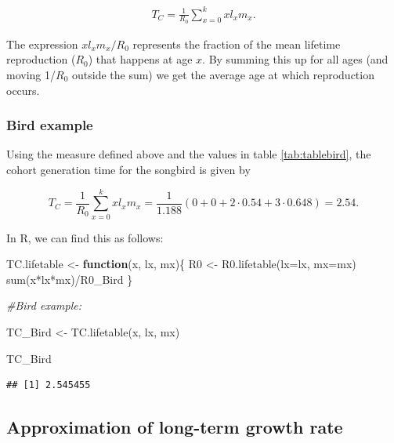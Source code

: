 \documentclass[
]{book}
\newenvironment{Shaded}{\begin{snugshade}}{\end{snugshade}}
\newcommand{\AttributeTok}[1]{\textcolor[rgb]{0.77,0.63,0.00}{#1}}
\newcommand{\CommentTok}[1]{\textcolor[rgb]{0.56,0.35,0.01}{\textit{#1}}}
\newcommand{\ControlFlowTok}[1]{\textcolor[rgb]{0.13,0.29,0.53}{\textbf{#1}}}
\newcommand{\FunctionTok}[1]{\textcolor[rgb]{0.00,0.00,0.00}{#1}}
\newcommand{\NormalTok}[1]{#1}
\newcommand{\OtherTok}[1]{\textcolor[rgb]{0.56,0.35,0.01}{#1}}
\newcommand{\SpecialCharTok}[1]{\textcolor[rgb]{0.00,0.00,0.00}{#1}}
\begin{document}
\begin{align}
T_C=\frac{1}{R_0}\sum_{x=0}^{k} xl_xm_x.
\label{eq:Generation}
\end{align}

The expression \(xl_xm_x/R_0\) represents the fraction of the mean lifetime reproduction (\(R_0\)) that happens at age \(x\). By summing this up for all ages (and moving 1/\(R_0\) outside the sum) we get the average age at which reproduction occurs.

\hypertarget{bird-example-1}{%
\subsubsection*{Bird example}\label{bird-example-1}}

Using the measure defined above and the values in table \ref{tab:tablebird}, the cohort generation time for the songbird is given by

\[
T_C=\frac{1}{R_0}\sum_{x=0}^k xl_xm_x=\frac{1}{1.188} (0+0+2\cdot0.54+3\cdot0.648)=2.54.
\]

In R, we can find this as follows:

\begin{Shaded}
\begin{Highlighting}[]
\NormalTok{TC.lifetable }\OtherTok{\textless{}{-}} \ControlFlowTok{function}\NormalTok{(x, lx, mx)\{}
\NormalTok{  R0 }\OtherTok{\textless{}{-}} \FunctionTok{R0.lifetable}\NormalTok{(}\AttributeTok{lx=}\NormalTok{lx, }\AttributeTok{mx=}\NormalTok{mx)}
  \FunctionTok{sum}\NormalTok{(x}\SpecialCharTok{*}\NormalTok{lx}\SpecialCharTok{*}\NormalTok{mx)}\SpecialCharTok{/}\NormalTok{R0\_Bird}
\NormalTok{\}}

\CommentTok{\#Bird example:}

\NormalTok{TC\_Bird }\OtherTok{\textless{}{-}} \FunctionTok{TC.lifetable}\NormalTok{(x,  lx, mx)}

\NormalTok{TC\_Bird}
\end{Highlighting}
\end{Shaded}

\begin{verbatim}
## [1] 2.545455
\end{verbatim}

\hypertarget{approximation-of-long-term-growth-rate}{%
\subsection{Approximation of long-term growth rate}\label{approximation-of-long-term-growth-rate}}
\end{document}
